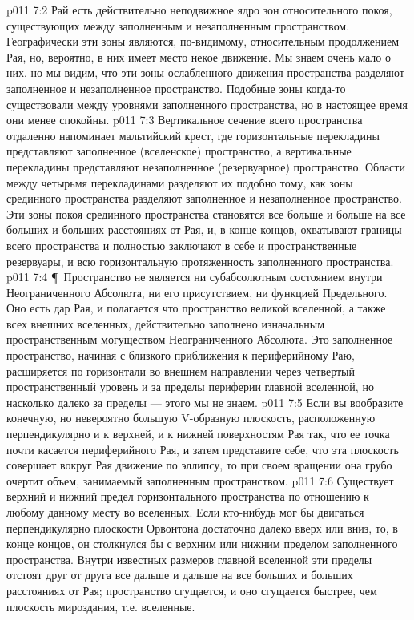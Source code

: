 \vs p011 7:2 Рай есть действительно неподвижное ядро зон относительного покоя, существующих между заполненным и незаполненным пространством. Географически эти зоны являются, по\hyp{}видимому, относительным продолжением Рая, но, вероятно, в них имеет место некое движение. Мы знаем очень мало о них, но мы видим, что эти зоны ослабленного движения пространства разделяют заполненное и незаполненное пространство. Подобные зоны когда\hyp{}то существовали между уровнями заполненного пространства, но в настоящее время они менее спокойны.
\vs p011 7:3 Вертикальное сечение всего пространства отдаленно напоминает мальтийский крест, где горизонтальные перекладины представляют заполненное (вселенское) пространство, а вертикальные перекладины представляют незаполненное (резервуарное) пространство. Области между четырьмя перекладинами разделяют их подобно тому, как зоны срединного пространства разделяют заполненное и незаполненное пространство. Эти зоны покоя срединного пространства становятся все больше и больше на все больших и больших расстояниях от Рая, и, в конце концов, охватывают границы всего пространства и полностью заключают в себе и пространственные резервуары, и всю горизонтальную протяженность заполненного пространства.
\vs p011 7:4 \P\ Пространство не является ни субабсолютным состоянием внутри Неограниченного Абсолюта, ни его присутствием, ни функцией Предельного. Оно есть дар Рая, и полагается что пространство великой вселенной, а также всех внешних вселенных, действительно заполнено изначальным пространственным могуществом Неограниченного Абсолюта. Это заполненное пространство, начиная с близкого приближения к периферийному Раю, расширяется по горизонтали во внешнем направлении через четвертый пространственный уровень и за пределы периферии главной вселенной, но насколько далеко за пределы --- этого мы не знаем.
\vs p011 7:5 Если вы вообразите конечную, но невероятно большую V\hyp{}образную плоскость, расположенную перпендикулярно и к верхней, и к нижней поверхностям Рая так, что ее точка почти касается периферийного Рая, и затем представите себе, что эта плоскость совершает вокруг Рая движение по эллипсу, то при своем вращении она грубо очертит объем, занимаемый заполненным пространством.
\vs p011 7:6 Существует верхний и нижний предел горизонтального пространства по отношению к любому данному месту во вселенных. Если кто\hyp{}нибудь мог бы двигаться перпендикулярно плоскости Орвонтона достаточно далеко вверх или вниз, то, в конце концов, он столкнулся бы с верхним или нижним пределом заполненного пространства. Внутри известных размеров главной вселенной эти пределы отстоят друг от друга все дальше и дальше на все больших и больших расстояниях от Рая; пространство сгущается, и оно сгущается быстрее, чем плоскость мироздания, т.е. вселенные.
